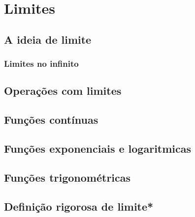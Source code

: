 
\chapter{Limites}\label{cap:limites}

\emconstrucao

\section{A ideia de limite}\label{sec:limites_ideia}
\subsection {Limites no infinito}
\construirSec

\section{Operações com limites}\label{sec:limites_opera}
\construirSec

\section{Funções contínuas}\label{sec:limites_fun_cont}
\construirSec

\section{Funções exponenciais e logaritmicas}\label{sec:limites_exp_log}
\construirSec

\section{Funções trigonométricas}\label{sec:limites_fun_trigo} %
\construirSec

\section{Definição rigorosa de limite*}\label{sec:limites_def_rigor}
\construirSec

